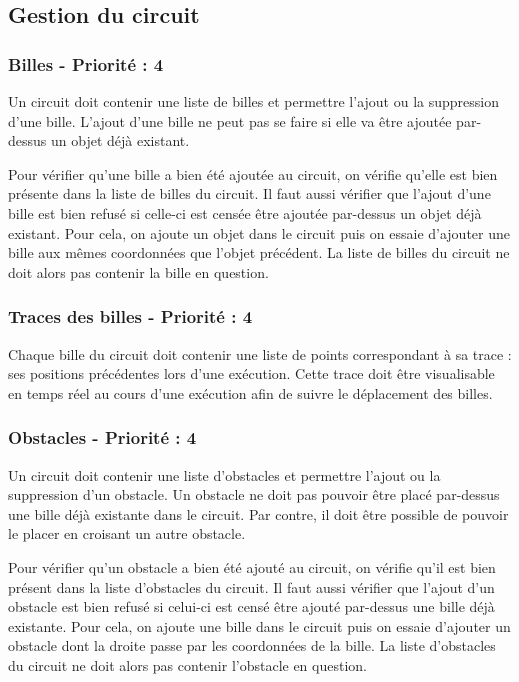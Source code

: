 \documentclass{report}
\begin{document}
\subsection{Gestion du circuit}

\subsubsection{Billes - Priorité : 4}

Un circuit doit contenir une liste de billes et permettre l’ajout ou la suppression d’une bille. L’ajout d’une bille ne peut pas se faire si elle va être ajoutée par-dessus un objet déjà existant.

Pour vérifier qu’une bille a bien été ajoutée au circuit, on vérifie qu’elle est bien présente dans la liste de billes du circuit. Il faut aussi vérifier que l’ajout d’une bille est bien refusé si celle-ci est censée être ajoutée par-dessus un objet déjà existant. Pour cela, on ajoute un objet dans le circuit puis on essaie d’ajouter une bille aux mêmes coordonnées que l’objet précédent. La liste de billes du circuit ne doit alors pas contenir la bille en question.

\subsubsection{Traces des billes - Priorité : 4}

Chaque bille du circuit doit contenir une liste de points correspondant à sa trace : ses positions précédentes lors d’une exécution. Cette trace doit être visualisable en temps réel au cours d’une exécution afin de suivre le déplacement des billes.


\subsubsection{Obstacles - Priorité : 4}

Un circuit doit contenir une liste d’obstacles et permettre l’ajout ou la suppression d’un obstacle. Un obstacle ne doit pas pouvoir être placé par-dessus une bille déjà existante dans le circuit. Par contre, il doit être possible de pouvoir le placer en croisant un autre obstacle.

Pour vérifier qu’un obstacle a bien été ajouté au circuit, on vérifie qu’il est bien présent dans la liste d’obstacles du circuit. Il faut aussi vérifier que l’ajout d’un obstacle est bien refusé si celui-ci est censé être ajouté par-dessus une bille déjà existante. Pour cela, on ajoute une bille dans le circuit puis on essaie d’ajouter un obstacle dont la droite passe par les coordonnées de la bille. La liste d’obstacles du circuit ne doit alors pas contenir l’obstacle en question.
\end{document}
